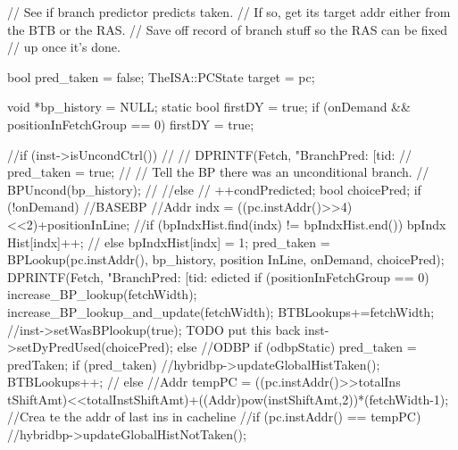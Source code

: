 \begin{DoxyCode}
{
    // See if branch predictor predicts taken.
    // If so, get its target addr either from the BTB or the RAS.
    // Save off record of branch stuff so the RAS can be fixed
    // up once it's done.

    bool pred_taken = false;
    TheISA::PCState target = pc;

    void *bp_history = NULL;
        static bool firstDY = true;
        if (onDemand && positionInFetchGroup == 0)
                firstDY = true;

    //if (inst->isUncondCtrl())
    //{
    //    DPRINTF(Fetch, "BranchPred: [tid:%
    //    pred_taken = true;
    //    // Tell the BP there was an unconditional branch.
    //    BPUncond(bp_history);
    //}
    //else
    //{
      ++condPredicted;
                bool choicePred;
        if (!onDemand) { //BASEBP
                        //Addr indx = ((pc.instAddr()>>4)<<2)+positionInLine;
                        //if (bpIndxHist.find(indx) != bpIndxHist.end()) { bpIndx
      Hist[indx]++;
                        //} else { bpIndxHist[indx] = 1; }
                        pred_taken = BPLookup(pc.instAddr(), bp_history, position
      InLine, onDemand, choicePred);
                        DPRINTF(Fetch, "BranchPred: [tid:%
      edicted %
                        if (positionInFetchGroup == 0) {
                                increase_BP_lookup(fetchWidth);
                                increase_BP_lookup_and_update(fetchWidth);
                                BTBLookups+=fetchWidth;
                        }
                        //inst->setWasBPlookup(true); TODO put this back
                        inst->setDyPredUsed(choicePred);
        } else { //ODBP
                        if (odbpStatic)
                        {
                            pred_taken = predTaken;
                                if (pred_taken) {
                                        //hybridbp->updateGlobalHistTaken();
                                        BTBLookups++;
                                //} else {
                                        //Addr tempPC = ((pc.instAddr()>>totalIns
      tShiftAmt)<<totalInstShiftAmt)+((Addr)pow(instShiftAmt,2))*(fetchWidth-1); //Crea
      te the addr of last ins in cacheline
                                        //if (pc.instAddr() == tempPC)
                                        //hybridbp->updateGlobalHistNotTaken();
                                }
}}}}
\end{DoxyCode}
